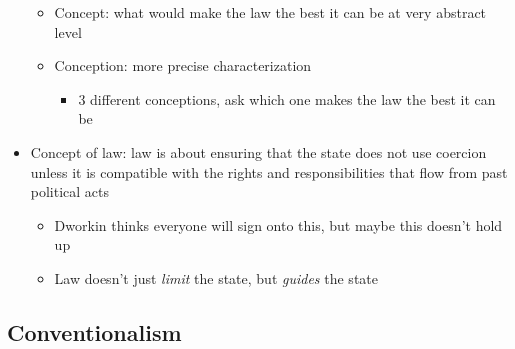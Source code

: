 \begin{itemize}
  \begin{itemize}
  \tightlist
  \item
    Concept: what would make the law the best it can be at very abstract
    level
  \item
    Conception: more precise characterization

    \begin{itemize}
    \tightlist
    \item
      3 different conceptions, ask which one makes the law the best it
      can be
    \end{itemize}
  \end{itemize}
\item
  Concept of law: law is about ensuring that the state does not use
  coercion unless it is compatible with the rights and responsibilities
  that flow from past political acts

  \begin{itemize}
  \tightlist
  \item
    Dworkin thinks everyone will sign onto this, but maybe this doesn't
    hold up
  \item
    Law doesn't just \emph{limit} the state, but \emph{guides} the state
  \end{itemize}
\end{itemize}

\hypertarget{conventionalism}{%
\subsection{Conventionalism}\label{conventionalism}}

